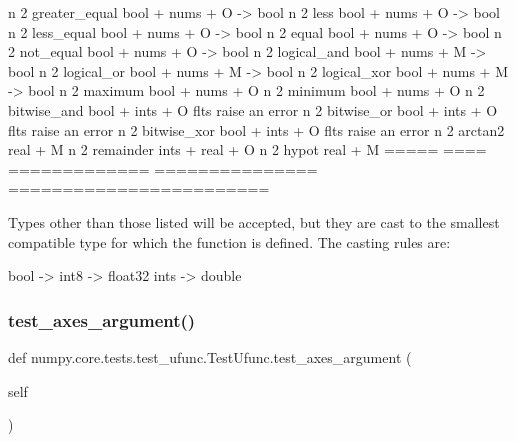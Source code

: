\begin{DoxyVerb}
n      2     greater_equal  bool + nums + O  -> bool
n      2     less           bool + nums + O  -> bool
n      2     less_equal     bool + nums + O  -> bool
n      2     equal          bool + nums + O  -> bool
n      2     not_equal      bool + nums + O  -> bool
n      2     logical_and    bool + nums + M  -> bool
n      2     logical_or     bool + nums + M  -> bool
n      2     logical_xor    bool + nums + M  -> bool
n      2     maximum        bool + nums + O
n      2     minimum        bool + nums + O
n      2     bitwise_and    bool + ints + O  flts raise an error
n      2     bitwise_or     bool + ints + O  flts raise an error
n      2     bitwise_xor    bool + ints + O  flts raise an error
n      2     arctan2        real + M
n      2     remainder      ints + real + O
n      2     hypot          real + M
=====  ====  =============  ===============  ========================

Types other than those listed will be accepted, but they are cast to
the smallest compatible type for which the function is defined. The
casting rules are:

bool -> int8 -> float32
ints -> double\end{DoxyVerb}
 \mbox{\label{classnumpy_1_1core_1_1tests_1_1test__ufunc_1_1TestUfunc_a60cb21686d58cc7c99318f96269d8993}} 
\subsubsection{\texorpdfstring{test\+\_\+axes\+\_\+argument()}{test\_axes\_argument()}}
{\footnotesize\ttfamily def numpy.\+core.\+tests.\+test\+\_\+ufunc.\+Test\+Ufunc.\+test\+\_\+axes\+\_\+argument (\begin{DoxyParamCaption}\item[{}]{self }\end{DoxyParamCaption})}

\mbox{\label{classnumpy_1_1core_1_1tests_1_1test__ufunc_1_1TestUfunc_ae047a0677ba08be66418b35d6f2aca14}} 
